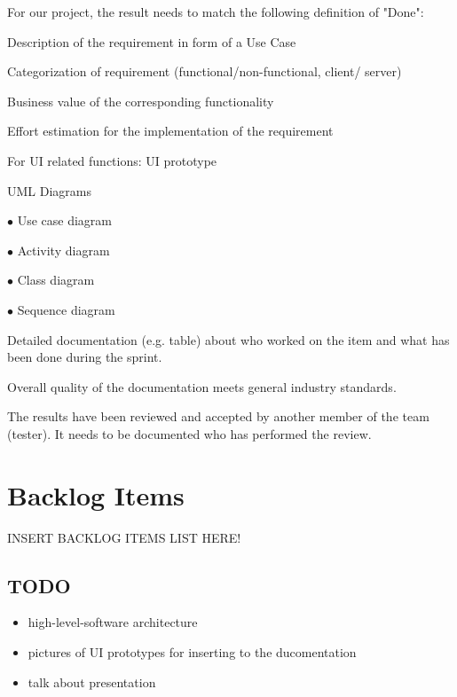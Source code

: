 \documentclass[a4paper, 12pt]{article}
\begin{document}
For our project, the result needs to match the following definition of "Done":
\begin{todolist}

\item Description of the requirement in form of a Use Case
\item Categorization of requirement (functional/non-functional, client/ server)
\item Business value of the corresponding functionality
\item Effort estimation for the implementation of the requirement
\item For UI related functions: UI prototype
\item UML Diagrams 

    $\bullet$ Use case diagram
    
    $\bullet$ Activity diagram
    
    $\bullet$ Class diagram
    
    $\bullet$ Sequence diagram
    
\item Detailed documentation (e.g. table) about who worked on the item and what has been done during the sprint.
\item Overall quality of the documentation meets general industry standards.
\item The results have been reviewed and accepted by another member of the team (tester). It needs to be documented who has performed the review.

\end{todolist}


\section{Backlog Items}

INSERT BACKLOG ITEMS LIST HERE!

\subsection{TODO}
\begin{itemize}
\item high-level-software architecture
\item pictures of UI prototypes for inserting to the ducomentation
\item talk about presentation
\end{itemize}
\end{document}

